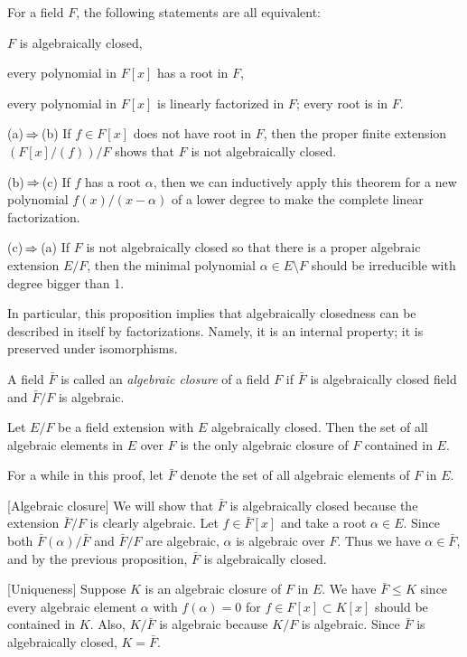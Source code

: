 \documentclass{../note}
\begin{document}
\begin{prop}
For a field $F$, the following statements are all equivalent:
\begin{parts}
\item $F$ is algebraically closed,
\item every polynomial in $F[x]$ has a root in $F$,
\item every polynomial in $F[x]$ is linearly factorized in $F$; every root is in $F$.
\end{parts}
\end{prop}
\begin{pf}
(a)$\impl$(b)
If $f\in F[x]$ does not have root in $F$, then the proper finite extension $(F[x]/(f))/F$ shows that $F$ is not algebraically closed.

(b)$\impl$(c)
If $f$ has a root $\alpha$, then we can inductively apply this theorem for a new polynomial $f(x)/(x-\alpha)$ of a lower degree to make the complete linear factorization.

(c)$\impl$(a)
If $F$ is not algebraically closed so that there is a proper algebraic extension $E/F$, then the minimal polynomial $\alpha\in E\setminus F$ should be irreducible with degree bigger than 1.
\end{pf}
\begin{rmk}
In particular, this proposition implies that algebraically closedness can be described in itself by factorizations.
Namely, it is an internal property; it is preserved under isomorphisms.
\end{rmk}


\begin{defn}
A field $\bar F$ is called an \emph{algebraic closure} of a field $F$ if $\bar F$ is algebraically closed field and $\bar F/F$ is algebraic.
\end{defn}

\begin{prop}
Let $E/F$ be a field extension with $E$ algebraically closed.
Then the set of all algebraic elements in $E$ over $F$ is the only algebraic closure of $F$ contained in $E$.
\end{prop}
\begin{pf}
For a while in this proof, let $\bar F$ denote the set of all algebraic elements of $F$ in $E$.

[Algebraic closure]
We will show that $\bar F$ is algebraically closed because the extension $\bar F/F$ is clearly algebraic.
Let $f\in\bar F[x]$ and take a root $\alpha\in E$.
Since both $\bar F(\alpha)/\bar F$ and $\bar F/F$ are algebraic, $\alpha$ is algebraic over $F$.
Thus we have $\alpha\in\bar F$, and by the previous proposition, $\bar F$ is algebraically closed.

[Uniqueness]
Suppose $K$ is an algebraic closure of $F$ in $E$.
We have $\bar F\le K$ since every algebraic element $\alpha$ with $f(\alpha)=0$ for $f\in F[x]\subset K[x]$ should be contained in $K$.
Also, $K/\bar F$ is algebraic because $K/F$ is algebraic.
Since $\bar F$ is algebraically closed, $K=\bar F$.
\end{pf}
\end{document}
